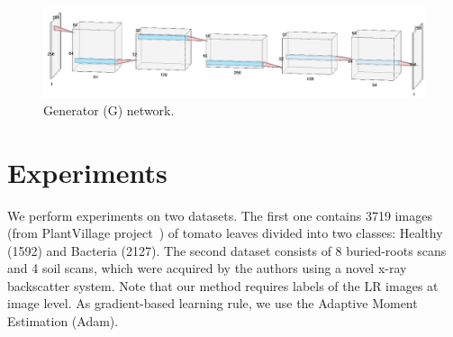 \documentclass[10pt,twocolumn,letterpaper]{article}
\begin{document}
\begin{figure}[h]
\begin{center}
\includegraphics[scale=0.30]{G_net.png}
\end{center}
\label{fig:G_net}
\caption{Generator (G) network.}
\end{figure}


\section{Experiments}
\label{sec:experiments}


We perform experiments on two datasets. The first one contains 3719 images (from PlantVillage project~\cite{Hughes2015}) of tomato leaves divided into two classes: Healthy (1592) and Bacteria (2127). The second dataset consists of 8 buried-roots scans and 4 soil scans, which were acquired by the authors using a novel x-ray backscatter system. Note that our method requires labels of the LR images at image level. As gradient-based learning rule, we use the Adaptive Moment Estimation (Adam). 
\end{document}
